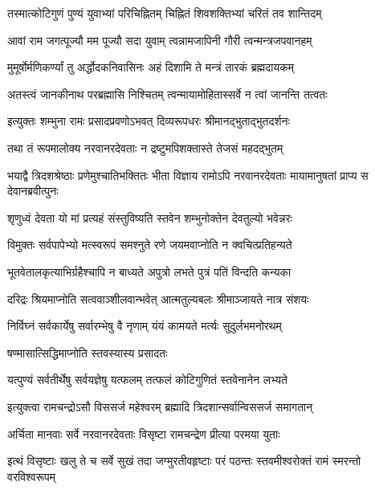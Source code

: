 \twolineshloka
{तस्मात्कोटिगुणं पुण्यं युवाभ्यां परिचिह्नितम्}
{चिह्नितं शिवशक्तिभ्यां चरितं तव शान्तिदम्}%

\twolineshloka
{आवां राम जगत्पूज्यौ मम पूज्यौ सदा युवाम्}
{त्वन्नामजापिनी गौरी त्वन्मन्त्रजपवानहम्}%

\twolineshloka
{मुमूर्षोर्मणिकर्ण्यां तु अर्द्धोदकनिवासिनः}
{अहं दिशामि ते मन्त्रं तारकं ब्रह्मदायकम्}%

\twolineshloka
{अतस्त्वं जानकीनाथ परब्रह्मासि निश्चितम्}
{त्वन्मायामोहितास्सर्वे न त्वां जानन्ति तत्वतः}%


\twolineshloka
{इत्युक्तः शम्भुना रामः प्रसादप्रवणोऽभवत्}
{दिव्यरूपधरः श्रीमानद्भुताद्भुतदर्शनः}%

\twolineshloka
{तथा तं रूपमालोक्य नरवानरदेवताः}
{न द्रष्टुमपिशक्तास्ते तेजसं महदद्भुतम्}%


\threelineshloka
{भयाद्वै त्रिदशश्रेष्ठाः प्रणेमुश्चातिभक्तितः}
{भीता विज्ञाय रामोऽपि नरवानरदेवताः}
{मायामानुषतां प्राप्य स देवानब्रवीत्पुनः}%


\twolineshloka
{शृणुध्वं देवता यो मां प्रत्यहं संस्तुविष्यति}
{स्तवेन शम्भुनोक्तेन देवतुल्यो भवेन्नरः}%

\twolineshloka
{विमुक्तः सर्वपापेभ्यो मत्स्वरूपं समश्नुते}
{रणे जयमवाप्नोति न क्वचित्प्रतिहन्यते}%

\twolineshloka
{भूतवेतालकृत्याभिर्ग्रहैश्चापि न बाध्यते}
{अपुत्रो लभते पुत्रं पतिं विन्दति कन्यका}%

\twolineshloka
{दरिद्रः श्रियमाप्नोति सत्ववाञ्शीलवान्भवेत्}
{आत्मतुल्यबलः श्रीमाञ्जायते नात्र संशयः}%

\twolineshloka
{निर्विघ्नं सर्वकार्येषु सर्वारम्भेषु वै नृणाम्}
{यंयं कामयते मर्त्यः सुदुर्लभमनोरथम्}%

षण्मासात्सिद्धिमाप्नोति स्तवस्यास्य प्रसादतः

\twolineshloka
{यत्पुण्यं सर्वतीर्थेषु सर्वयज्ञेषु यत्फलम्}
{तत्फलं कोटिगुणितं स्तवेनानेन लभ्यते}%


\twolineshloka
{इत्युक्त्वा रामचन्द्रोऽसौ विससर्ज महेश्वरम्}
{ब्रह्मादि त्रिदशान्सर्वान्विससर्ज समागतान्}%

\twolineshloka
{अर्चिता मानवाः सर्वे नरवानरदेवताः}
{विसृष्टा रामचन्द्रेण प्रीत्या परमया युताः}%

\twolineshloka
{इत्थं विसृष्टाः खलु ते च सर्वे सुखं तदा जग्मुरतीवहृष्टाः}
{परं पठन्तः स्तवमीश्वरोक्तं रामं स्मरन्तो वरविश्वरूपम्}%

